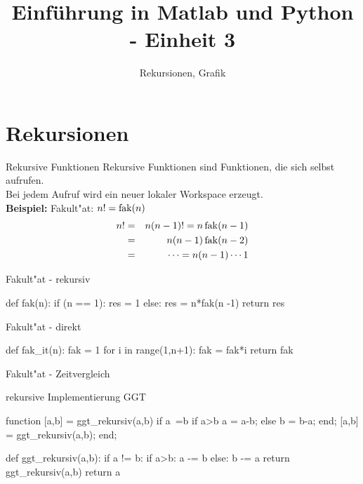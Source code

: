 \documentclass[hyperref={xetex}]{beamer}
\title{Einführung in Matlab und Python - Einheit 3}
\subtitle{Rekursionen, Grafik}
\begin{document}
\titlepage


\section{Rekursionen}
%
%
\begin{frame}[fragile]{Rekursive Funktionen}
Rekursive Funktionen sind Funktionen, die sich selbst aufrufen.\\
Bei jedem Aufruf wird ein neuer lokaler Workspace erzeugt.\\[1cm]

\textbf{Beispiel:} Fakult"at: $n!=\operatorname{fak}(n)$\\
\begin{eqnarray*}
 n!& = & n(n-1)!=n \operatorname{fak}(n-1)\\
& = & n(n-1)\operatorname{fak}(n-2)\\
& = & \cdots= n(n-1)\cdots 1 
\end{eqnarray*}
\end{frame}
%
%
\begin{frame}[fragile]{Fakult"at - rekursiv}
\begin{pyin}
def fak(n):
    if (n == 1):
        res = 1
    else:
        res = n*fak(n -1)
    return res
\end{pyin}
\end{frame}
%
%
\begin{frame}[fragile]{Fakult"at - direkt}
\begin{pyin}
def fak_it(n):
    fak = 1
    for i in range(1,n+1):
        fak = fak*i
    return fak
\end{pyin}
\end{frame}
%
%
\begin{frame}[fragile]{Fakult"at - Zeitvergleich}
\begin{pyin}
\end{pyin}
\end{frame}
%
%
\begin{frame}[fragile]{rekursive Implementierung GGT}
\begin{matlabin}
function [a,b] = ggt_rekursiv(a,b)
if a~=b
  if a>b
    a = a-b;
  else
    b = b-a;
  end;
  [a,b] = ggt_rekursiv(a,b);
end;  
\end{matlabin}
\begin{pyin}
def ggt_rekursiv(a,b):
    if a != b:
        if a>b:
            a -= b
        else:
            b -= a
        return ggt_rekursiv(a,b)
    return a
\end{pyin}
\end{frame}
\end{document}
